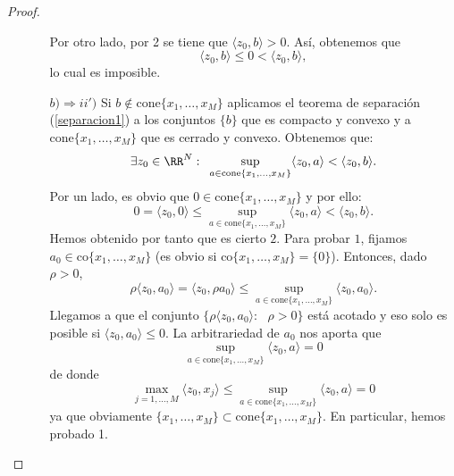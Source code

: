 \begin{proof}
\begin{itemize}
\begin{itemize}
	Por otro lado, por 2 se tiene que  $ \langle z_0, b\rangle > 0$. Así, obtenemos que
	\[
	\langle z_0, b \rangle \leq 0 <  \langle z_0, b \rangle,
	\]
	lo cual es imposible.
	\item[$ b) \Longrightarrow ii') $] Si $ b \notin \mathrm{cone}\{x_1,\dots, x_M \} $ aplicamos el teorema de separación (\ref{separacion1}) a los conjuntos $ \{b\} $ que es compacto y convexo y a $ \mathrm{cone}\{x_1,\dots, x_M \} $ que es cerrado y convexo. Obtenemos que:
	\[
	\exists z_0 \in \RR^N: \text{ } \sup_{a \in \mathrm{cone}\{x_1,\dots, x_M \}} \langle z_0, a \rangle < \langle z_0, b \rangle.
	\]
	Por un lado, es obvio que $ 0 \in \mathrm{cone}\{x_1,\dots, x_M \} $ y por ello:
	\[
	0 = \langle z_0, 0\rangle \leq \sup_{a \in \mathrm{cone}\{x_1,\dots, x_M \}} \langle z_0, a \rangle < \langle z_0, b \rangle.
	\]
	Hemos obtenido por tanto que es cierto $ 2 $. Para probar $ 1 $, fijamos $ a_0 \in \mathrm{co}\{x_1,\dots, x_M \}$ (es obvio si $ \mathrm{co}\{x_1,\dots, x_M \} = \{0\}$). Entonces, dado $ \rho > 0 $,
	\[
	\rho\langle z_0, a_0 \rangle = \langle z_0, \rho a_0 \rangle \leq \sup_{a \in \mathrm{cone}\{x_1,\dots, x_M \}} \langle z_0, a_0 \rangle.
	\]
	Llegamos a que el conjunto $ \lbrace\rho\langle z_0, a_0 \rangle: \text{ } \rho > 0 \rbrace  $ está acotado y eso solo es posible si $ \langle z_0, a_0 \rangle \leq 0 $. La arbitrariedad de $ a_0 $ nos aporta que 
	\[ \sup_{a \in \mathrm{cone}\{x_1,\dots, x_M \}} \langle z_0, a \rangle= 0 \] de donde 
	\[
	\max_{ j=1,\dots,M} \langle z_0, x_j \rangle \leq \sup_{a \in \mathrm{cone}\{x_1,\dots, x_M \}} \langle z_0, a \rangle = 0  
	\]
	ya que obviamente $  \{x_1,\dots, x_M \} \subset \mathrm{cone}\{x_1,\dots, x_M \} $. En particular, hemos probado 1.
	\end{itemize}
\end{itemize}
\end{proof}

